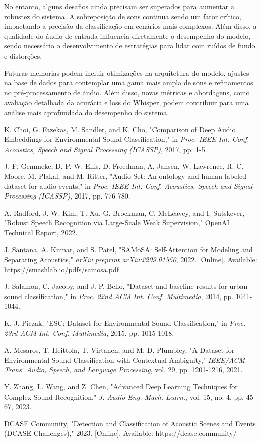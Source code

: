 \documentclass[conference]{IEEEtran}
\begin{document}
No entanto, alguns desafios ainda precisam ser superados para aumentar a robustez do sistema. A sobreposição de sons continua sendo um fator crítico, impactando a precisão da classificação em cenários mais complexos. Além disso, a qualidade do áudio de entrada influencia diretamente o desempenho do modelo, sendo necessário o desenvolvimento de estratégias para lidar com ruídos de fundo e distorções.

Futuras melhorias podem incluir otimizações na arquitetura do modelo, ajustes na base de dados para contemplar uma gama mais ampla de sons e refinamentos no pré-processamento de áudio. Além disso, novas métricas e abordagens, como avaliação detalhada da acurácia e loss do Whisper, podem contribuir para uma análise mais aprofundada do desempenho do sistema.

\begin{thebibliography}{00}
 K. Choi, G. Fazekas, M. Sandler, and K. Cho, "Comparison of Deep Audio Embeddings for Environmental Sound Classification," in \textit{Proc. IEEE Int. Conf. Acoustics, Speech and Signal Processing (ICASSP)}, 2017, pp. 1-5.

 J. F. Gemmeke, D. P. W. Ellis, D. Freedman, A. Jansen, W. Lawrence, R. C. Moore, M. Plakal, and M. Ritter, "Audio Set: An ontology and human-labeled dataset for audio events," in \textit{Proc. IEEE Int. Conf. Acoustics, Speech and Signal Processing (ICASSP)}, 2017, pp. 776-780.

 A. Radford, J. W. Kim, T. Xu, G. Brockman, C. McLeavey, and I. Sutskever, "Robust Speech Recognition via Large-Scale Weak Supervision," OpenAI Technical Report, 2022.

 J. Santana, A. Kumar, and S. Patel, "SAMoSA: Self-Attention for Modeling and Separating Acoustics," \textit{arXiv preprint arXiv:2209.01550}, 2022. [Online]. Available: https://smashlab.io/pdfs/samosa.pdf

 J. Salamon, C. Jacoby, and J. P. Bello, "Dataset and baseline results for urban sound classification," in \textit{Proc. 22nd ACM Int. Conf. Multimedia}, 2014, pp. 1041-1044.

 K. J. Piczak, "ESC: Dataset for Environmental Sound Classification," in \textit{Proc. 23rd ACM Int. Conf. Multimedia}, 2015, pp. 1015-1018.

 A. Mesaros, T. Heittola, T. Virtanen, and M. D. Plumbley, "A Dataset for Environmental Sound Classification with Contextual Ambiguity," \textit{IEEE/ACM Trans. Audio, Speech, and Language Processing}, vol. 29, pp. 1201-1216, 2021.

 Y. Zhang, L. Wang, and Z. Chen, "Advanced Deep Learning Techniques for Complex Sound Recognition," \textit{J. Audio Eng. Mach. Learn.}, vol. 15, no. 4, pp. 45-67, 2023.

 DCASE Community, "Detection and Classification of Acoustic Scenes and Events (DCASE Challenges)," 2023. [Online]. Available: https://dcase.community/
\end{thebibliography}
\end{document}
